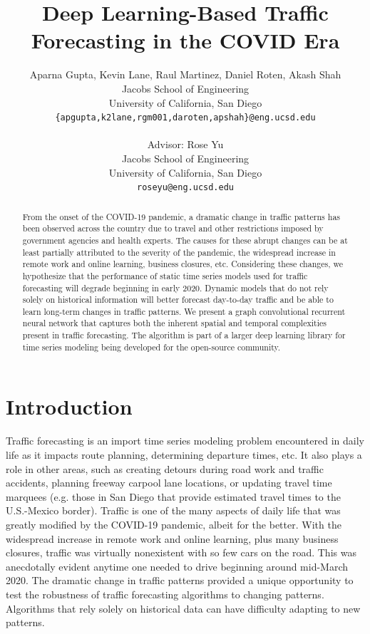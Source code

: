 \documentclass{article}
\title{
Deep Learning-Based Traffic Forecasting in the COVID Era %
}
\author{
 Aparna Gupta, Kevin Lane, Raul Martinez, Daniel Roten, Akash Shah \\
  Jacobs School of Engineering \\
  University of California, San Diego \\
  \texttt{\{apgupta,\hspace{1mm}k2lane,\hspace{1mm}rgm001,\hspace{1mm}daroten,\hspace{1mm}apshah\}@eng.ucsd.edu} \\
  
  \And
  
  Advisor: Rose Yu \\
  Jacobs School of Engineering \\
  University of California, San Diego \\
  \texttt{roseyu@eng.ucsd.edu} \\
  
	
}
\begin{document}
\maketitle

\begin{abstract}
From the onset of the COVID-19 pandemic, a dramatic change in traffic patterns has been observed across the country due to travel and other restrictions imposed by government agencies and health experts. The causes for these abrupt changes can be at least partially attributed to the severity of the pandemic, the widespread increase in remote work and online learning, business closures, etc. Considering these changes, we hypothesize that the performance of static time series models used for traffic forecasting will degrade beginning in early 2020. Dynamic models that do not rely solely on historical information will better forecast day-to-day traffic and be able to learn long-term changes in traffic patterns. We present a graph convolutional recurrent neural network that captures both the inherent spatial and temporal complexities present in traffic forecasting. The algorithm is part of a larger deep learning library for time series modeling being developed for the open-source community.
\end{abstract}




\section{Introduction}

Traffic forecasting is an import time series modeling problem encountered in daily life as it impacts route planning, determining departure times, etc. It also plays a role in other areas, such as creating detours during road work and traffic accidents, planning freeway carpool lane locations, or updating travel time marquees (e.g. those in San Diego that provide estimated travel times to the U.S.-Mexico border). Traffic is one of the many aspects of daily life that was greatly modified by the COVID-19 pandemic, albeit for the better. With the widespread increase in remote work and online learning, plus many business closures, traffic was virtually nonexistent with so few cars on the road. This was anecdotally evident anytime one needed to drive beginning around mid-March 2020. The dramatic change in traffic patterns provided a unique opportunity to test the robustness of traffic forecasting algorithms to changing patterns. Algorithms that rely solely on historical data can have difficulty adapting to new patterns.
\end{document}
